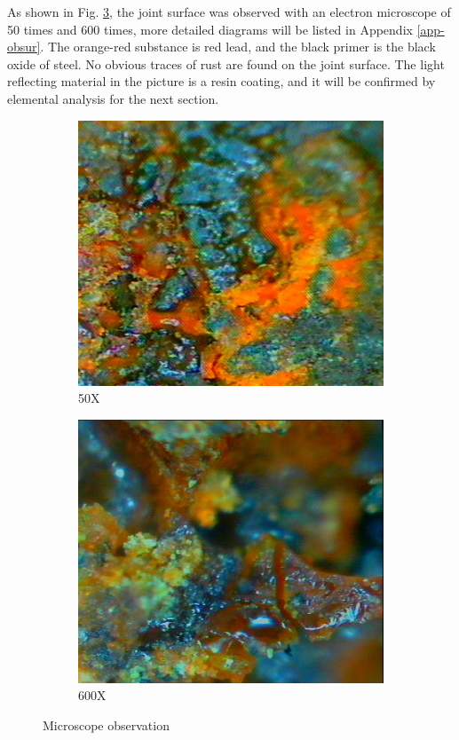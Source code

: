 As shown in Fig. \ref{ch3fig3}, the joint surface was observed with an electron microscope of 50 times and 600 times, more detailed diagrams will be listed in Appendix \ref{app-obsur}. The orange-red substance is red lead, and the black primer is the black oxide of steel. No obvious traces of rust are found on the joint surface. The light reflecting material in the picture is a resin coating, and it will be confirmed by elemental analysis for the next section.

\begin{figure}[htbp]
    \centering
    \begin{subfigure}[t]{0.4\textwidth}
    \includegraphics[width=\linewidth]{imgs/ch3/fig3a.jpeg}
    \caption{50X}
    \label{ch3fig3a}  
    \end{subfigure}
    \hfill
    \begin{subfigure}[t]{0.4\textwidth}
    \includegraphics[width=\linewidth]{imgs/ch3/fig3b.jpeg}
    \caption{600X}
    \label{ch3fig3b}  
    \end{subfigure}
    \caption{Microscope observation}
    \label{ch3fig3}
\end{figure}

